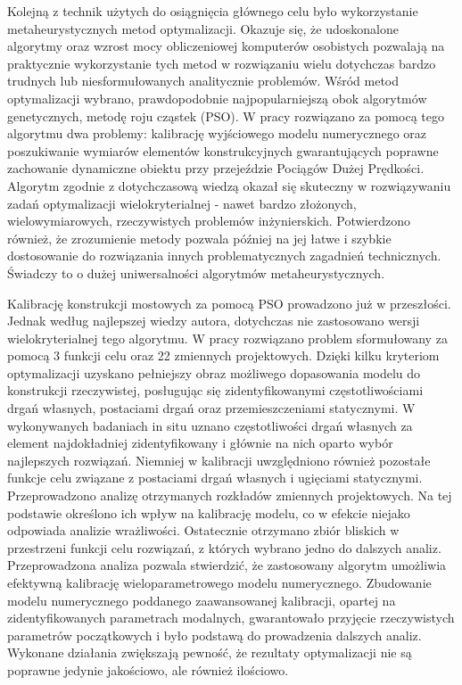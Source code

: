 Kolejną z technik użytych do osiągnięcia głównego celu było wykorzystanie metaheurystycznych metod optymalizacji. Okazuje się, że udoskonalone algorytmy oraz wzrost mocy obliczeniowej komputerów osobistych pozwalają na praktycznie wykorzystanie tych metod w rozwiązaniu wielu dotychczas bardzo trudnych lub niesformułowanych analitycznie problemów. Wśród metod optymalizacji wybrano, prawdopodobnie najpopularniejszą obok algorytmów genetycznych, metodę roju cząstek (PSO). W pracy rozwiązano za pomocą tego algorytmu dwa problemy: kalibrację wyjściowego modelu numerycznego oraz poszukiwanie wymiarów elementów konstrukcyjnych gwarantujących poprawne zachowanie dynamiczne obiektu przy przejeździe Pociągów Dużej Prędkości. Algorytm zgodnie z dotychczasową wiedzą okazał się skuteczny w rozwiązywaniu zadań optymalizacji wielokryterialnej - nawet bardzo złożonych, wielowymiarowych, rzeczywistych problemów inżynierskich. Potwierdzono również, że zrozumienie metody pozwala później na jej łatwe i szybkie dostosowanie do rozwiązania innych problematycznych zagadnień technicznych. Świadczy to o dużej uniwersalności algorytmów metaheurystycznych.

Kalibrację konstrukcji mostowych za pomocą PSO prowadzono już w przeszłości. Jednak według najlepszej wiedzy autora, dotychczas nie zastosowano wersji wielokryterialnej tego algorytmu. W pracy rozwiązano problem sformułowany za pomocą 3 funkcji celu oraz 22 zmiennych projektowych. Dzięki kilku kryteriom optymalizacji uzyskano pełniejszy obraz możliwego dopasowania modelu do konstrukcji rzeczywistej, posługując się zidentyfikowanymi częstotliwościami drgań własnych, postaciami drgań oraz przemieszczeniami statycznymi. W wykonywanych badaniach in situ uznano częstotliwości drgań własnych za element najdokładniej zidentyfikowany i głównie na nich oparto wybór najlepszych rozwiązań. Niemniej w kalibracji uwzględniono również pozostałe funkcje celu związane z postaciami drgań własnych i ugięciami statycznymi. Przeprowadzono analizę otrzymanych rozkładów zmiennych projektowych. Na tej podstawie określono ich wpływ na kalibrację modelu, co w efekcie niejako odpowiada analizie wrażliwości. Ostatecznie otrzymano zbiór bliskich w przestrzeni funkcji celu rozwiązań, z których wybrano jedno do dalszych analiz. Przeprowadzona analiza pozwala stwierdzić, że zastosowany algorytm umożliwia efektywną kalibrację wieloparametrowego modelu numerycznego. Zbudowanie modelu numerycznego poddanego zaawansowanej kalibracji, opartej na zidentyfikowanych parametrach modalnych, gwarantowało przyjęcie rzeczywistych parametrów początkowych i było podstawą do prowadzenia dalszych analiz. Wykonane działania zwiększają pewność, że rezultaty optymalizacji nie są poprawne jedynie jakościowo, ale również ilościowo. 

